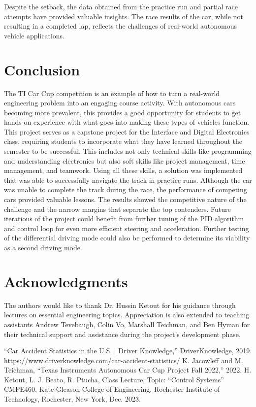 \documentclass[conference]{IEEEtran}
\begin{document}
Despite the setback, the data obtained from the practice run and partial race attempts have provided valuable insights. The race results of the car, while not resulting in a completed lap, reflects the challenges of real-world autonomous vehicle applications.

\section{Conclusion}

The TI Car Cup competition is an example of how to turn a real-world engineering problem into an engaging course activity. With autonomous cars becoming more prevalent, this provides a good opportunity for students to get hands-on experience with what goes into making these types of vehicles function. This project serves as a capstone project for the Interface and Digital Electronics class, requiring students to incorporate what they have learned throughout the semester to be successful. This includes not only technical skills like programming and understanding electronics but also soft skills like project management, time management, and teamwork. Using all these skills, a solution was implemented that was able to successfully navigate the track in practice runs. Although the car was unable to complete the track during the race, the performance of competing cars provided valuable lessons. The results showed the competitive nature of the challenge and the narrow margins that separate the top contenders. Future iterations of the project could benefit from further tuning of the PID algorithm and control loop for even more efficient steering and acceleration. Further testing of the differential driving mode could also be performed to determine its viability as a second driving mode.

\section{Acknowledgments}

The authors would like to thank Dr. Hussin Ketout for his guidance through lectures on essential engineering topics. Appreciation is also extended to teaching assistants Andrew Tevebaugh, Colin Vo, Marshall Teichman, and Ben Hyman for their technical support and assistance during the project's development phase.

\begin{thebibliography}{00}
 “Car Accident Statistics in the U.S. | Driver Knowledge,” DriverKnowledge, 2019. https://www.driverknowledge.com/car-accident-statistics/
 K. Jacowleff and M. Teichman, “Texas Instruments Autonomous Car Cup Project Fall 2022,” 2022.
 H. Ketout, L. J. Beato, R. Ptucha, Class Lecture, Topic: “Control Systems” CMPE460, Kate Gleason College of Engineering, Rochester Institute of Technology, Rochester, New York, Dec. 2023.
\end{thebibliography}
\end{document}
